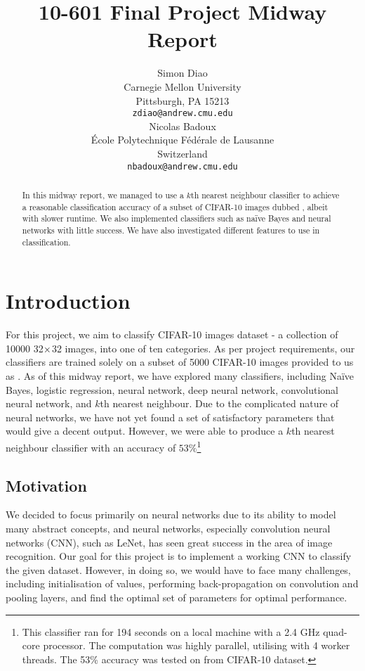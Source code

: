 \documentclass{article} %
\title{10-601 Final Project Midway Report}
\author{
Simon Diao\\
Carnegie Mellon University\\
Pittsburgh, PA 15213 \\
\texttt{zdiao@andrew.cmu.edu} \\
\And
Nicolas Badoux \\
\'Ecole Polytechnique F\'ed\'erale de Lausanne \\
Switzerland \\
\texttt{nbadoux@andrew.cmu.edu} \\
}
\begin{document}
\maketitle

\begin{abstract}
In this midway report, we managed to use a $k$th nearest neighbour classifier to achieve a reasonable classification accuracy of a subset of CIFAR-10 images dubbed , albeit with slower runtime. We also implemented classifiers such as na\"ive Bayes and neural networks with little success. We have also investigated different features to use in classification.
\end{abstract}

\section{Introduction}

For this project, we aim to classify CIFAR-10 images dataset - a collection of 10000 32$\times$32 images, into one of ten categories. As per project requirements, our classifiers are trained solely on a subset of 5000 CIFAR-10 images provided to us as . As of this midway report, we have explored many classifiers, including Na\"ive Bayes, logistic regression, neural network, deep neural network, convolutional neural network, and $k$th nearest neighbour. Due to the complicated nature of neural networks, we have not yet found a set of satisfactory parameters that would give a decent output. However, we were able to
produce a $k$th nearest neighbour classifier with an accuracy of $53\%$\footnote{This classifier ran for 194 seconds on a local machine with a 2.4 GHz quad-core
processor. The computation was highly parallel, utilising  with 4 worker threads. The 53\% accuracy was tested on  from 
CIFAR-10 dataset.}

\subsection{Motivation}

We decided to focus primarily on neural networks due to its ability to model many abstract concepts, and neural networks, especially convolution neural networks (CNN), such as LeNet,
has seen great success in the area of image recognition. Our goal for this project is to implement a working CNN to classify the given dataset. However, in doing so, we would have 
to face many challenges, including initialisation of values, performing back-propagation on convolution and pooling layers, and find the optimal set of parameters for optimal
performance.
\end{document}
